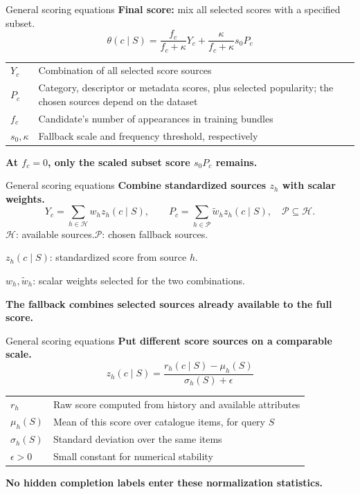 \documentclass[11pt,aspectratio=169]{beamer}
\newcommand{\key}[1]{\textcolor{Accent}{\textbf{#1}}}
\begin{document}
\begin{frame}{General scoring equations}
\textbf{Final score:} mix all selected scores with a specified subset.
\vspace{4mm}
\[
 \boxed{\theta(c\mid S)=\frac{f_c}{f_c+\kappa}Y_c+
                      \frac{\kappa}{f_c+\kappa}s_0P_c}
\]
\vspace{3mm}
\begin{tabular}{@{}p{}p{}@{}}
$Y_c$ & Combination of all selected score sources\\[5pt]
$P_c$ & Category, descriptor or metadata scores, plus selected popularity; the chosen sources depend on the dataset\\[5pt]
$f_c$ & Candidate's number of appearances in training bundles\\[5pt]
$s_0,\kappa$ & Fallback scale and frequency threshold, respectively
\end{tabular}\par
\vspace{4mm}
\key{At $f_c=0$, only the scaled subset score $s_0P_c$ remains.}
\end{frame}

\begin{frame}{General scoring equations}
\textbf{Combine standardized sources $z_h$ with scalar weights.}
\[
 Y_c=\sum_{h\in\mathcal H}w_hz_h(c\mid S),\qquad
 P_c=\sum_{h\in\mathcal P}\widetilde w_hz_h(c\mid S),\quad\mathcal P\subseteq\mathcal H.
\]
$\mathcal H$: available sources.\quad $\mathcal P$: chosen fallback sources.\par
\vspace{6mm}
$z_h(c\mid S)$: standardized score from source $h$.\par\vspace{4mm}
$w_h,\widetilde w_h$: scalar weights selected for the two combinations.\par\vspace{6mm}
\key{The fallback combines selected sources already available to the full score.}
\end{frame}

\begin{frame}{General scoring equations}
\textbf{Put different score sources on a comparable scale.}
\vspace{5mm}
\[
 \boxed{z_h(c\mid S)=\frac{r_h(c\mid S)-\mu_h(S)}{\sigma_h(S)+\epsilon}}
\]
\vspace{5mm}
\begin{tabular}{@{}ll@{}}
$r_h$ & Raw score computed from history and available attributes\\[4pt]
$\mu_h(S)$ & Mean of this score over catalogue items, for query $S$\\[4pt]
$\sigma_h(S)$ & Standard deviation over the same items\\[4pt]
$\epsilon>0$ & Small constant for numerical stability
\end{tabular}\par
\vspace{5mm}
\key{No hidden completion labels enter these normalization statistics.}
\end{frame}
\end{document}

